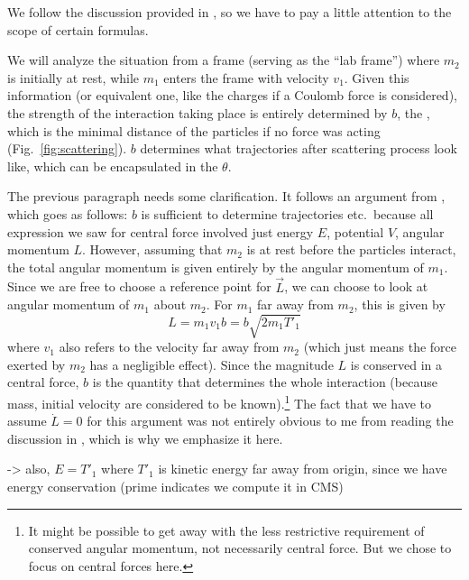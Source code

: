 \documentclass[../class_mech_main.tex]{subfiles}
\begin{document}
We follow the discussion provided in \cite{Thornton_2003}, so we have to pay a little attention to the scope of certain formulas. 


We will analyze the situation from a frame (serving as the \enquote{lab frame}) where $m_2$ is initially at rest, while $m_1$ enters the frame with velocity $v_1$. Given this information (or equivalent one, like the charges if a Coulomb force is considered), the strength of the interaction taking place is entirely determined by $b$, the , which is the minimal distance of the particles if no force was acting (Fig.~\ref{fig:scattering}). $b$ determines what trajectories after scattering process look like, which can be encapsulated in the  $\theta$.


The previous paragraph needs some clarification. It follows an argument from \cite{Thornton_2003}, which goes as follows: $b$ is sufficient to determine trajectories etc.~because all expression we saw for central force involved just energy $E$, potential $V$, angular momentum $L$. However, assuming that $m_2$ is at rest before the particles interact, the total angular momentum is given entirely by the angular momentum of $m_1$. Since we are free to choose a reference point for $\vec{L}$, we can choose to look at angular momentum of $m_1$ about $m_2$. For $m_1$ far away from $m_2$, this is given by
\begin{equation}
	L = m_1 v_1 b = b \sqrt{2 m_1 T'_1}
\end{equation}
where $v_1$ also refers to the velocity far away from $m_2$ (which just means the force exerted by $m_2$ has a negligible effect). Since the magnitude $L$ is conserved in a central force, $b$ is the quantity that determines the whole interaction (because mass, initial velocity are considered to be known).\footnote{It might be possible to get away with the less restrictive requirement of conserved angular momentum, not necessarily central force. But we chose to focus on central forces here.} The fact that we have to assume $\dot{L} = 0$ for this argument was not entirely obvious to me from reading the discussion in \cite{Thornton_2003}, which is why we emphasize it here.

-> also, $E = T'_1$ where $T'_1$ is kinetic energy far away from origin, since we have energy conservation (prime indicates we compute it in CMS)

\end{document}
